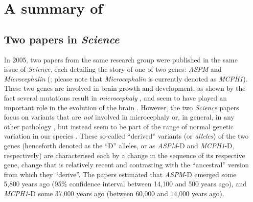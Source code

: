 \documentclass[twoside,twocolumn]{article}
\begin{document}

\section{A summary of \citet{dediu_ladd_2007}} \label{summary_dediu_ladd}

\subsection{Two papers in \textit{Science}}

In 2005, two papers from the same research group were published in the same issue of \textit{Science}, each detailing the story of one of two genes: \textit{ASPM} \citep{mekelbobrov_aspm_2005} and \textit{Microcephalin} (\citealp{evans_microcephalin_2005}; please note that \textit{Microcephalin} is currently denoted as \textit{MCPH1}).
These two genes are involved in brain growth and development, as shown by the fact several mutations result in \textit{microcephaly} \citep{cox_microcephaly_2006}, and seem to have played an important role in the evolution of the brain \citep{ali_positive_2008,montgomery_adaptive_2011,montgomery_microcephaly_2014}.
However, the two \textit{Science} papers focus on variants that are \emph{not} involved in microcephaly or, in general, in any other pathology \citep{mekelbobrov_aspm_2005,evans_microcephalin_2005}, but instead seem to be part of the range of normal genetic variation in our species \citep{jobling_human_2013}.
These so-called ``derived'' variants (or \emph{alleles}) of the two genes (henceforth denoted as the ``D'' alleles, or as \textit{ASPM}-D and \textit{MCPH1}-D, respectively) are characterised each by a change in the sequence of its respective gene, change that is relatively recent and contrasting with the ``ancestral'' version from which they ``derive''.
The papers estimated that \textit{ASPM}-D emerged some 5,800 years ago (95\% confidence interval between 14,100 and 500 years ago), and \textit{MCPH1}-D some 37,000 years ago (between 60,000 and 14,000 years ago).
\end{document}
